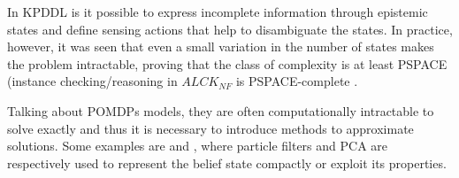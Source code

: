 \documentclass[pdftex,12pt,a4paper]{report}
\begin{document}
\noindent In KPDDL is it possible to express incomplete information through epistemic states and define sensing actions that help to disambiguate the states. In practice, however, it was seen that even a small variation in the number of states makes the problem intractable, proving that the class of complexity is at least PSPACE (instance checking/reasoning in $ALCK_{NF}$ is PSPACE-complete \cite{donini1997autoepistemic}.%
\newline

\noindent Talking about POMDPs models, they are often computationally intractable to solve exactly and thus it is necessary to introduce methods to approximate solutions. Some examples are \cite{roy2005finding}%
and \cite{brafman2014contingent},%
where particle filters and PCA are respectively used to represent the belief state compactly or exploit its properties.
\end{document}
